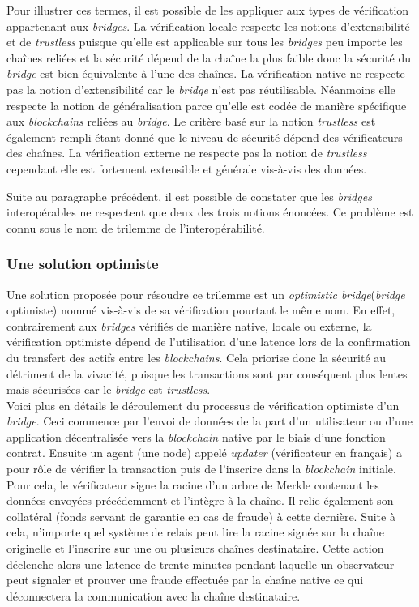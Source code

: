 Pour illustrer ces termes, il est possible de les appliquer aux types de vérification appartenant aux \textit{bridges}. La vérification locale respecte les notions d’extensibilité et de \textit{trustless} puisque qu'elle est applicable sur tous les \textit{bridges} peu importe les chaînes reliées et la sécurité dépend de la chaîne la plus faible donc la sécurité du \textit{bridge} est bien équivalente à l’une des chaînes.
La vérification native ne respecte pas la notion d’extensibilité car le \textit{bridge} n’est pas réutilisable. Néanmoins elle respecte la notion de généralisation parce qu’elle est codée de manière spécifique aux \textit{\gls{blockchain}s} reliées au \textit{bridge}. Le critère basé sur la notion \textit{trustless} est également rempli étant donné que le niveau de sécurité dépend des vérificateurs des chaînes.
La vérification externe ne respecte pas la notion de \textit{trustless} cependant elle est fortement extensible et générale vis-à-vis des données. \cite{NgraveVerif}

 Suite au paragraphe précédent, il est possible de constater que les \textit{bridges} interopérables ne respectent que deux des trois notions énoncées. Ce problème est connu sous le nom de trilemme de l’interopérabilité. 

\subsubsection{Une solution optimiste}

Une solution proposée pour résoudre ce trilemme est un \textit{optimistic bridge}(\textit{bridge} optimiste) nommé vis-à-vis de sa vérification pourtant le même nom\cite{OptimisticBhuptani}. En effet, contrairement aux \textit{bridges} vérifiés de manière native, locale ou externe, la vérification optimiste dépend de l’utilisation d’une latence lors de la confirmation du transfert des \gls{actif}s entre les \textit{\gls{blockchain}s}. Cela priorise donc la sécurité au détriment de la vivacité, puisque les transactions sont par conséquent plus lentes mais sécurisées car le \textit{bridge} est \textit{trustless}. \\

Voici plus en détails le déroulement du processus de vérification optimiste d’un \textit{bridge}.
Ceci commence par l’envoi de données de la part d’un utilisateur ou d’une application décentralisée vers la \textit{\gls{blockchain}} native par le biais d’une fonction contrat.
Ensuite un agent (une node) appelé \textit{updater} (vérificateur en français) a pour rôle de vérifier la transaction puis de l’inscrire dans la \textit{\gls{blockchain}} initiale. Pour cela, le vérificateur signe la racine d’un arbre de Merkle contenant les données envoyées précédemment et l’intègre à la chaîne. Il relie également son collatéral (fonds servant de garantie en cas de fraude) à cette dernière.
Suite à cela, n’importe quel système de relais peut lire la racine signée sur la chaîne originelle et l’inscrire sur une ou plusieurs chaînes destinataire. Cette action déclenche alors une latence de trente minutes pendant laquelle un observateur peut signaler et prouver une fraude effectuée par la chaîne native ce qui déconnectera la communication avec la chaîne destinataire. 

